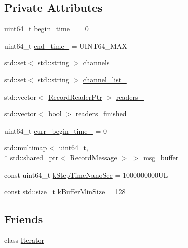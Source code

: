 \subsection*{Private Attributes}
\begin{DoxyCompactItemize}
\item 
uint64\-\_\-t \hyperlink{classapollo_1_1cyber_1_1record_1_1RecordViewer_a8d4525026acdfae38a0fe6c943315b9f}{begin\-\_\-time\-\_\-} = 0
\item 
uint64\-\_\-t \hyperlink{classapollo_1_1cyber_1_1record_1_1RecordViewer_a122d865feea8eefb448bdb10c47082c8}{end\-\_\-time\-\_\-} = U\-I\-N\-T64\-\_\-\-M\-A\-X
\item 
std\-::set$<$ std\-::string $>$ \hyperlink{classapollo_1_1cyber_1_1record_1_1RecordViewer_ade7529a1b8e9e8bc5f79bff113c32092}{channels\-\_\-}
\item 
std\-::set$<$ std\-::string $>$ \hyperlink{classapollo_1_1cyber_1_1record_1_1RecordViewer_ad695e1188e7f7b25fc1e9a86fc7ed87f}{channel\-\_\-list\-\_\-}
\item 
std\-::vector$<$ \hyperlink{classapollo_1_1cyber_1_1record_1_1RecordViewer_a70f4191b0d79cbc8d8213f1227fd8609}{Record\-Reader\-Ptr} $>$ \hyperlink{classapollo_1_1cyber_1_1record_1_1RecordViewer_abfbbd6d4ac0ef2819ffa57be352e7bd1}{readers\-\_\-}
\item 
std\-::vector$<$ bool $>$ \hyperlink{classapollo_1_1cyber_1_1record_1_1RecordViewer_a08005bf5452618ab9bdedd6f54da1bc9}{readers\-\_\-finished\-\_\-}
\item 
uint64\-\_\-t \hyperlink{classapollo_1_1cyber_1_1record_1_1RecordViewer_a5a1cce2bc3ddd982742354c66aef13fd}{curr\-\_\-begin\-\_\-time\-\_\-} = 0
\item 
std\-::multimap$<$ uint64\-\_\-t, \\*
std\-::shared\-\_\-ptr$<$ \hyperlink{structapollo_1_1cyber_1_1record_1_1RecordMessage}{Record\-Message} $>$ $>$ \hyperlink{classapollo_1_1cyber_1_1record_1_1RecordViewer_ac7877d001fd1ebb44c43cbc37ac136cb}{msg\-\_\-buffer\-\_\-}
\item 
const uint64\-\_\-t \hyperlink{classapollo_1_1cyber_1_1record_1_1RecordViewer_aac975118f31e4a376fa1f02f0a04291c}{k\-Step\-Time\-Nano\-Sec} = 1000000000\-U\-L
\item 
const std\-::size\-\_\-t \hyperlink{classapollo_1_1cyber_1_1record_1_1RecordViewer_a9b5c3fd4e6ec8d65628d070a40f854a7}{k\-Buffer\-Min\-Size} = 128
\end{DoxyCompactItemize}
\subsection*{Friends}
\begin{DoxyCompactItemize}
\item 
class \hyperlink{classapollo_1_1cyber_1_1record_1_1RecordViewer_a9830fc407400559db7e7783cc10a9394}{Iterator}
\end{DoxyCompactItemize}


